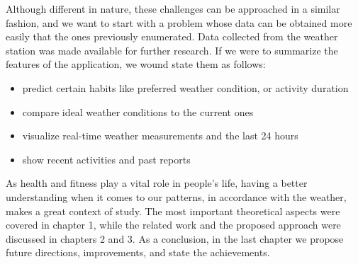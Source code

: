 Although different in nature, these challenges can be approached in a similar fashion, and we want to start with a problem whose data can be obtained more easily that the ones previously enumerated. Data collected from the weather station was made available for further research. If we were to summarize the features of the application, we wound state them as follows: 
\begin{itemize}
    \item{predict certain habits like preferred weather condition, or activity duration}
    \item{compare ideal weather conditions to the current ones}
    \item{visualize real-time weather measurements and the last 24 hours}
    \item{show recent activities and past reports}
\end{itemize}

As health and fitness play a vital role in people's life, having a better understanding when it comes to our patterns, in accordance with the weather, makes a great context of study. The most important theoretical aspects were covered in chapter 1, while the related work and the proposed approach were discussed in chapters 2 and 3. As a conclusion, in the last chapter we propose future directions, improvements, and state the achievements.

